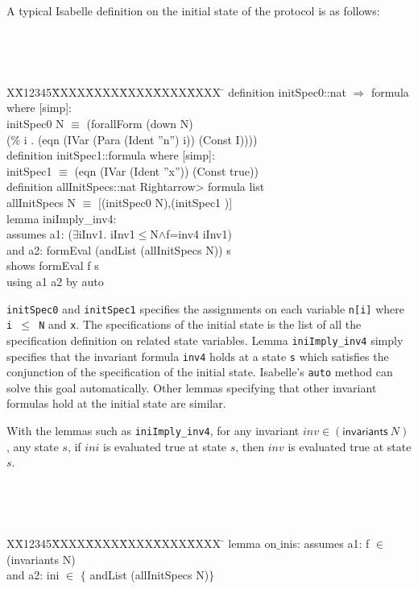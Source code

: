 \documentclass[final]{IEEEtran}
\newlength{\fminilength}
\newenvironment{fmini}[1][\linewidth]
  {\setlength{\fminilength}{#1\fboxsep-2\fboxrule}%
   \vspace{2ex}\noindent\begin{lrbox}{\fminibox}\begin{minipage}{\fminilength}%
   \mbox{ }\hfill\vspace{-2.5ex}}%
  {\end{minipage}\end{lrbox}\vspace{1ex}\hspace{0ex}%
   \framebox{\usebox{\fminibox}}}
\newenvironment{specification}
{\noindent\scriptsize
\tt\begin{fmini}\begin{tabbing}X\=X12345\=XXXX\=XXXX\=XXXX\=XXXX\=XXXX
\=\+\kill} {\end{tabbing}\normalfont\end{fmini}}
\def \iInv {iInv}
\begin{document}
{A typical Isabelle definition on the initial state of the protocol is as follows:

\begin{specification}
definition initSpec0::nat $\Rightarrow$ formula where [simp]:\\
initSpec0 N $\equiv$ (forallForm (down N) \\
(\% i . (eqn (IVar (Para (Ident ''n'') i)) (Const I))))\\

definition initSpec1::formula where [simp]:\\
initSpec1  $\equiv$ (eqn (IVar (Ident ''x'')) (Const true))\\

definition allInitSpecs::nat \<Rightarrow> formula list\\
allInitSpecs N $\equiv$ [(initSpec0 N),(initSpec1 )]\\

lemma iniImply\_inv4:\\
assumes a1: ($\exists$\iInv1. \iInv1$\le$N$\wedge$f=inv4 \iInv1)\\
and a2: formEval (andList (allInitSpecs N)) s\\
shows formEval f s\\
 using a1 a2 by auto\\
\end{specification}

{\tt initSpec0} and {\tt initSpec1} specifies the assignments on each variable {\tt n[i]} where {\tt i $\le$ N} and {\tt x}. The  specifications of the initial state is the list of all the specification definition on related state variables. Lemma {\tt iniImply\_inv4} simply specifies that the invariant formula {\tt inv4} holds at a state {\tt s} which satisfies the conjunction of the   specification of the initial state. Isabelle's {\tt auto} method can solve this goal automatically. Other lemmas specifying that other invariant formulas hold at the initial state are similar.

With the lemmas such as {\tt iniImply\_inv4}, for any invariant $inv \in (\mathsf{invariants} ~N) $,  any
state $s$, if $ini$ is evaluated true at state $s$, then $inv$ is
evaluated true at state $s$.

\begin{specification}
lemma on$\_$inis:
 assumes  a1:
f $\in$ (invariants N)\\
 and a2:
ini $\in$ $\{$
andList (allInitSpecs N)$\}$\\


\end{specification}}
\end{document}
